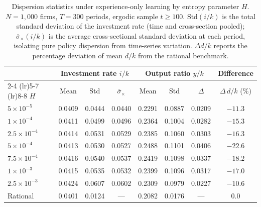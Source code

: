 \begin{table}[ht]
\centering
\small
\begin{tabular}{l ccc ccc c}
\toprule
 & \multicolumn{3}{c}{Investment rate $i/k$} 
 & \multicolumn{3}{c}{Output ratio $y/k$} 
 & Difference \\
\cmidrule(lr){2-4} \cmidrule(lr){5-7} \cmidrule(lr){8-8}
$H$ & Mean & Std & $\overline{\sigma}_{\times}$ 
    & Mean & Std & $\Delta$ 
    & $\Delta\, d/k$ (\%) \\
\midrule
$5 \times 10^{-5}$  & 0.0409 & 0.0444 & 0.0440 & 0.2291 & 0.0887 & 0.0209 & $-11.3$ \\
$1 \times 10^{-4}$  & 0.0411 & 0.0499 & 0.0496 & 0.2364 & 0.1004 & 0.0282 & $-15.3$ \\
$2.5\times 10^{-4}$ & 0.0414 & 0.0531 & 0.0529 & 0.2385 & 0.1060 & 0.0303 & $-16.3$ \\
$5 \times 10^{-4}$  & 0.0413 & 0.0530 & 0.0527 & 0.2488 & 0.1101 & 0.0406 & $-22.6$ \\
$7.5\times 10^{-4}$ & 0.0416 & 0.0540 & 0.0537 & 0.2419 & 0.1098 & 0.0337 & $-18.2$ \\
$1 \times 10^{-3}$  & 0.0415 & 0.0535 & 0.0532 & 0.2399 & 0.1096 & 0.0317 & $-17.0$ \\
$2.5\times 10^{-3}$ & 0.0424 & 0.0607 & 0.0602 & 0.2309 & 0.0979 & 0.0227 & $-10.6$ \\
\midrule
Rational             & 0.0401 & 0.0124 & ---    & 0.2082 & 0.0176 & ---    & $0.0$   \\
\bottomrule
\end{tabular}
\caption{Dispersion statistics under experience-only learning by entropy parameter $H$. 
$N = 1{,}000$ firms, $T = 300$ periods, ergodic sample $t \geq 100$. 
$\text{Std}(i/k)$ is the total standard deviation of the investment rate 
(time and cross-section pooled); $\overline{\sigma}_{\times}(i/k)$ is 
the average cross-sectional standard deviation at each period, isolating 
pure policy dispersion from time-series variation. 
$\Delta d/k$ reports the percentage deviation of mean $d/k$ from the 
rational benchmark.}
\label{tab:dispersion_by_H}
\end{table}

